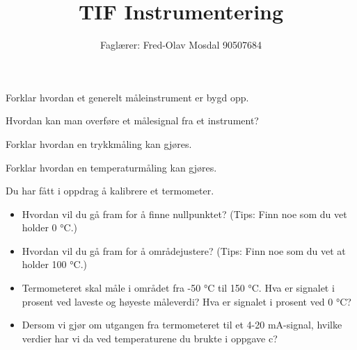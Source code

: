 \documentclass[12pt,a4paper]{article}
\def\oppgave{
		}
\begin{document}
\title{TIF Instrumentering}
\author{Faglærer: Fred-Olav Mosdal 90507684\\}
\maketitle
\oppgave{}%
\vskip 2.5pt 
Forklar hvordan et generelt måleinstrument er bygd opp.
\vskip 5pt 
\vskip 2.5pt 
\oppgave{}%
\vskip 2.5pt 
Hvordan kan man overføre et målesignal fra et instrument?
\vskip 5pt 
\vskip 2.5pt 
\oppgave{}%
\vskip 2.5pt 
Forklar hvordan en trykkmåling kan gjøres.
\vskip 5pt 
\vskip 2.5pt 
\oppgave{}%
\vskip 2.5pt 
Forklar hvordan en temperaturmåling kan gjøres.
\vskip 5pt 
\vskip 2.5pt 
\oppgave{}%
\vskip 2.5pt 
Du har fått i oppdrag å kalibrere et termometer.
\begin{itemize}
	\item Hvordan vil du gå fram for å finne nullpunktet? (Tips: Finn noe som du vet holder 0 °C.)\\
	\item Hvordan vil du gå fram for å områdejustere? (Tips: Finn noe som du vet at holder 100 °C.)\\
 	\item Termometeret skal måle i området fra -50 °C til 150 °C. Hva er signalet i prosent ved laveste og høyeste måleverdi? Hva er signalet i prosent ved 0 °C?\\
	\item Dersom vi gjør om utgangen fra termometeret til et 4-20 mA-signal, hvilke verdier har vi da ved temperaturene du brukte i oppgave c?\\


\end{itemize}
\end{document}
